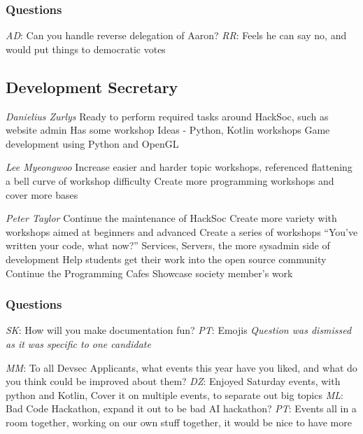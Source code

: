 \documentclass[11pt]{meetingmins}
\begin{document}
\subsubsection{Questions}
\begin{items}
	\item
	\textit{AD}: Can you handle reverse delegation of Aaron?
		\subitem
		\textit{RR}:
			\subsubitem
			Feels he can say no, and would put things to democratic votes
\end{items}


\subsection{Development Secretary}
\begin{items}
	\item
	\textit{Danielius Zurlys}
		\subitem
		Ready to perform required tasks around HackSoc, such as website admin
		\subitem
		Has some workshop Ideas - Python, Kotlin workshops
		\subitem
		Game development using Python and OpenGL
	
	\item
	\textit{Lee Myeongwoo}
		\subitem
		Increase easier and harder topic workshops, referenced flattening a bell curve of workshop difficulty
		\subitem
		Create more programming workshops and cover more bases
	
	\item
	\textit{Peter Taylor}
		\subitem
		Continue the maintenance of HackSoc
		\subitem
		Create more variety with workshops aimed at beginners and advanced
		\subitem
		Create a series of workshops ``You've written your code, what now?''
		\subitem
		Services, Servers, the more sysadmin side of development
		\subitem
		Help students get their work into the open source community
		\subitem
		Continue the Programming Cafes
		\subitem
		Showcase society member's work
\end{items}

\subsubsection{Questions}
\begin{items}
	\item
	\textit{SK}: How will you make documentation fun?
		\subitem
		\textit{PT}:
			\subsubitem
			Emojis
		\subitem
		\textit{Question was dismissed as it was specific to one candidate}

	\item
	\textit{MM}: To all Devsec Applicants, what events this year have you liked, and what do you think could be improved about them?
		\subitem
		\textit{DZ}:
			\subsubitem
			Enjoyed Saturday events, with python and Kotlin, Cover it on multiple events, to separate out big topics
		\subitem
		\textit{ML}:
			\subsubitem
			Bad Code Hackathon, expand it out to be bad AI hackathon?
		\subitem
		\textit{PT}:
			\subsubitem
			Events all in a room together, working on our own stuff together, it would be nice to have more
	
\end{items}
\end{document}

